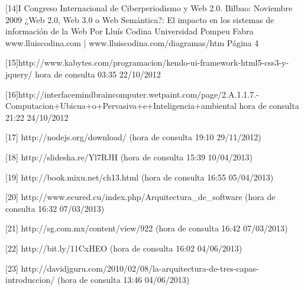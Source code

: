 [14]I Congreso Internacional de Ciberperiodismo y Web 2.0. Bilbao: Noviembre 2009
    ¿Web 2.0, Web 3.0 o Web Semántica?: El impacto en los sistemas de
    información de la Web
    Por Lluís Codina
    Universidad Pompeu Fabra
    www.lluiscodina.com | www.lluiscodina.com/diagramas/htm
    Página 4
    
[15]http://www.kabytes.com/programacion/kendo-ui-framework-html5-css3-y-jquery/ hora de consulta 03:35 22/10/2012

[16]http://interfacemindbraincomputer.wetpaint.com/page/2.A.1.1.7.-Computacion+Ubicua+o+Pervasiva+e+Inteligencia+ambiental hora de consulta 
21:22 24/10/2012

[17] http://nodejs.org/download/ (hora de consulta 19:10 29/11/2012) 

[18] http://slidesha.re/Yl7RJH (hora de consulta 15:39 10/04/2013) 

[19] http://book.mixu.net/ch13.html (hora de consulta 16:55 05/04/2013)

[20] http://www.ecured.cu/index.php/Arquitectura\_de\_software (hora de consulta 16:32 07/03/2013)

[21] http://sg.com.mx/content/view/922 (hora de consulta 16:42 07/03/2013)

[22] http://bit.ly/11CxHEO (hora de consulta 16:02 04/06/2013)

[23] http://davidjguru.com/2010/02/08/la-arquitectura-de-tres-capas-introduccion/ (hora de consulta 13:46 04/06/2013)